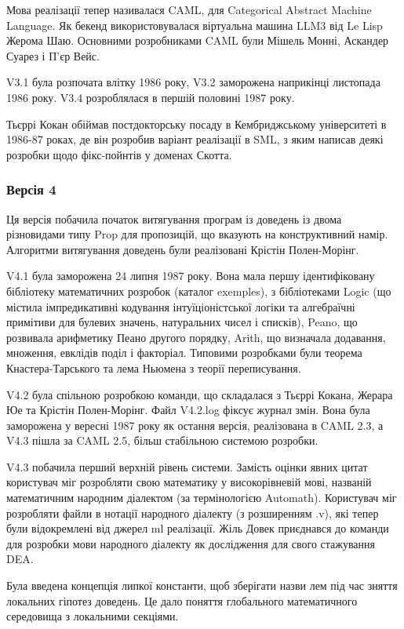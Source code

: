 \documentclass{article}
\begin{document}
Мова реалізації тепер називалася CAML, для Categorical Abstract Machine Language. Як бекенд використовувалася віртуальна машина LLM3 від Le Lisp Жерома Шаю. Основними розробниками CAML були Мішель Монні, Аскандер Суарез і П’єр Вейс.

V3.1 була розпочата влітку 1986 року, V3.2 заморожена наприкінці листопада 1986 року. V3.4 розроблялася в першій половині 1987 року.

Тьєррі Кокан обіймав постдокторську посаду в Кембриджському університеті в 1986-87 роках, де він розробив варіант реалізації в SML, з яким написав деякі розробки щодо фікс-пойнтів у доменах Скотта.

\subsubsection{Версія 4}

Ця версія побачила початок витягування програм із доведень із двома різновидами типу Prop для пропозицій, що вказують на конструктивний намір. Алгоритми витягування доведень були реалізовані Крістін Полен-Морінг.

V4.1 була заморожена 24 липня 1987 року. Вона мала першу ідентифіковану бібліотеку математичних розробок (каталог exemples), з бібліотеками Logic (що містила імпредикативні кодування інтуїціоністської логіки та алгебраїчні примітиви для булевих значень, натуральних чисел і списків), Peano, що розвивала арифметику Пеано другого порядку, Arith, що визначала додавання, множення, евклідів поділ і факторіал. Типовими розробками були теорема Кнастера-Тарського та лема Ньюмена з теорії переписування.

V4.2 була спільною розробкою команди, що складалася з Тьєррі Кокана, Жерара Юе та Крістін Полен-Морінг. Файл V4.2.log фіксує журнал змін. Вона була заморожена у вересні 1987 року як остання версія, реалізована в CAML 2.3, а V4.3 пішла за CAML 2.5, більш стабільною системою розробки.

V4.3 побачила перший верхній рівень системи. Замість оцінки явних цитат користувач міг розробляти свою математику у високорівневій мові, названій математичним народним діалектом (за термінологією Automath). Користувач міг розробляти файли в нотації народного діалекту (з розширенням .v), які тепер були відокремлені від джерел ml реалізації. Жіль Довек приєднався до команди для розробки мови народного діалекту як дослідження для свого стажування DEA.

Була введена концепція липкої константи, щоб зберігати назви лем під час зняття локальних гіпотез доведень. Це дало поняття глобального математичного середовища з локальними секціями.
\end{document}
